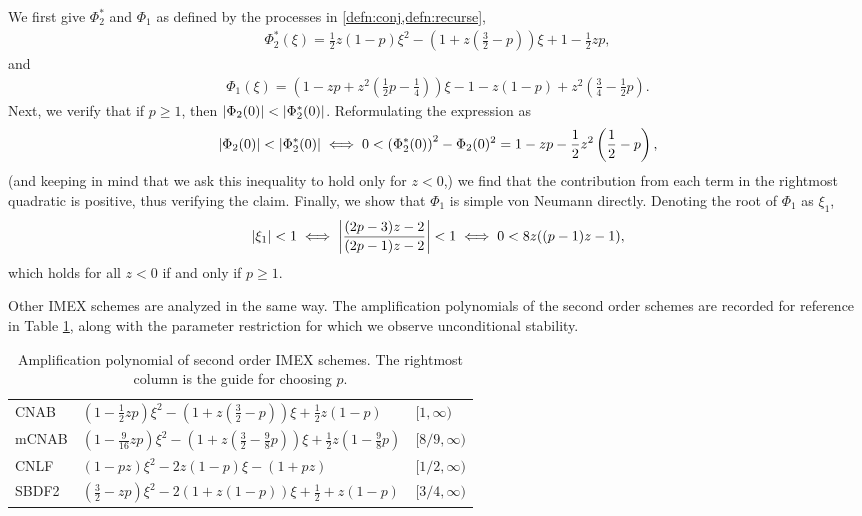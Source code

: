 We first give $\Phi_2^*$ and $\Phi_1$ as defined by the processes in \cref{defn:conj,defn:recurse},  
\begin{align}
\Phi_2^*(\xi) = \frac{1}{2}z(1-p) \xi^2 
- \left(1 + z\left(\frac{3}{2} - p \right)\right) \xi
+ 1 - \frac{1}{2}zp, 
\end{align}
and
\begin{align} 
\Phi_1(\xi) = \left(1 - zp + z^2 \left( \frac{1}{2} p - \frac{1}{4} \right) \right)\xi -1 - z(1-p) + z^2 \left( \frac{3}{4} - \frac{1}{2}p \right).
\end{align}
Next, we verify that if $p\geq 1$, then $\left|\Phi_2(0)\right| < \left|\Phi^*_2(0)\right|$. Reformulating the expression as
\begin{align*}
\left|\Phi_2(0)\right| < \left|\Phi^*_2(0)\right| 
\iff 
0 < \left(\Phi^*_2(0) \right)^2 - \Phi_2(0)^2
= 1 - zp - \frac{1}{2}z^2\left( \frac{1}{2} - p \right),
\end{align*}
(and keeping in mind that we ask this inequality to hold only for $z<0$,) we find that the contribution from each term  in the rightmost quadratic is positive, thus verifying the claim.
Finally, we show that $\Phi_1$ is simple von Neumann directly. Denoting the root of $\Phi_1$ as $\xi_1$, 
\begin{align*}
	\left|\xi_1\right| < 1 
\iff \left|\frac{(2p-3)z-2}{(2p-1)z-2}\right| < 1
\iff 0< 8z((p-1)z-1),  
\end{align*}
which holds for all $z<0$ if and only if $p\geq 1$.

Other IMEX schemes are analyzed in the same way. The amplification polynomials of the second order schemes are recorded for reference in Table \ref{table:amp poly 2}, along with the parameter restriction for which we observe unconditional stability.

\begin{table}[htb!]
	\centering
	\caption[Amplification polynomials of second order IMEX]{Amplification polynomial of second order IMEX schemes. The rightmost column is the guide for choosing $p$.}
	\begin{tabular}{lll}
		\toprule[1.25pt] 
		\head{Method} 
		& \head{Amplification Polynomial}
		& \head{$p\lambda/\lambda\in$}
		\\	\midrule 
		CNAB 
		& $\left(1 - \frac{1}{2}zp\right)\xi^2
		- \left(1 + z\left(\frac{3}{2}-p \right)\right)\xi + \frac{1}{2}z(1-p)$
		& $[1,\infty)$
		\\[2.6pt]
		mCNAB 
		& $\left(1 - \frac{9}{16}zp \right) \xi^2 - \left(1 + z\left(\frac{3}{2} - \frac{9}{8} p \right) \right)\xi
		+ \frac{1}{2}z\left(1 - \frac{9}{8}p \right) $
		& $[8/9,\infty)$
		\\[2.6pt]
		CNLF 
		& $\left(1-pz\right) \xi^2 -2z(1-p)\xi -(1+pz)$
		& $[1/2,\infty)$
		\\[2.6pt]
		SBDF2 
		& $\left(\frac{3}{2} - zp\right) \xi^2
		- 2\left(1 + z(1-p)\right) \xi 
		+ \frac{1}{2} + z(1-p)
		$
		& $[3/4,\infty)$
		\\ \bottomrule[1.25pt]
	\end{tabular}
\label{table:amp poly 2}
\end{table}

